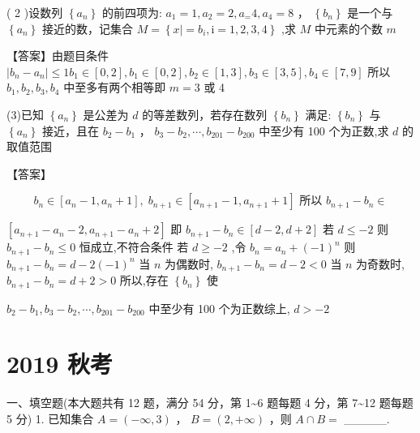 \documentclass[10pt]{article}
\newcommand*\circled[1]{\tikz[baseline=(char.base)]{\node[shape=circle,draw,inner sep=1.5pt] (char) {\small #1};}}
\begin{document}
( 2 )设数列 \(\left\{  {a}_{n}\right\}\) 的前四项为: \({a}_{1} = 1,{a}_{2} = 2,{a}_{ = }4,{a}_{4} = 8\) ， \(\left\{  {b}_{n}\right\}\) 是一个与 \(\left\{  {a}_{n}\right\}\) 接近的数，记集合 \(M = \left\{  {x \mid   = {b}_{i},\mathrm{i} = 1,2,3,4}\right\}\) ,求 \(M\) 中元素的个数 \(m\)

【答案】由题目条件 \(\left| {{b}_{n} - {a}_{n}}\right|  \leq  1{b}_{1} \in  \left\lbrack  {0,2}\right\rbrack  ,{b}_{1} \in  \left\lbrack  {0,2}\right\rbrack  ,{b}_{2} \in  \left\lbrack  {1,3}\right\rbrack  ,{b}_{3} \in  \left\lbrack  {3,5}\right\rbrack  ,{b}_{4} \in  \left\lbrack  {7,9}\right\rbrack\) 所以 \({b}_{1},{b}_{2},{b}_{3},{b}_{4}\) 中至多有两个相等即 \(m = 3\) 或 4

(3)已知 \(\left\{  {a}_{n}\right\}\) 是公差为 \(d\) 的等差数列，若存在数列 \(\left\{  {b}_{n}\right\}\) 满足: \(\left\{  {b}_{n}\right\}\) 与 \(\left\{  {a}_{n}\right\}\) 接近，且在 \({b}_{2} - {b}_{1}\) ， \({b}_{3} - {b}_{2},\cdots ,{b}_{201} - {b}_{200}\) 中至少有 100 个为正数,求 \(d\) 的取值范围

【答案】

\[
{b}_{n} \in  \left\lbrack  {{a}_{n} - 1,{a}_{n} + 1}\right\rbrack  ,\;{b}_{n + 1} \in  \left\lbrack  {{a}_{n + 1} - 1,{a}_{n + 1} + 1}\right\rbrack  \text{ 所以 }{b}_{n + 1} - {b}_{n} \in
\]

\(\left\lbrack  {{a}_{n + 1} - {a}_{n} - 2,{a}_{n + 1} - {a}_{n} + 2}\right\rbrack\) 即 \({b}_{n + 1} - {b}_{n} \in  \left\lbrack  {d - 2,d + 2}\right\rbrack\)  \circled{1} 若 \(d \leq   - 2\) 则 \({b}_{n + 1} - {b}_{n} \leq  0\) 恒成立,不符合条件 \circled{2} 若 \(d \geq   - 2\) ,令 \({b}_{n} = {a}_{n} + {\left( -1\right) }^{n}\) 则 \({b}_{n + 1} - {b}_{n} = d - 2{\left( -1\right) }^{n}\) 当 \(n\) 为偶数时, \({b}_{n + 1} - {b}_{n} = d - 2 < 0\) 当 \(n\) 为奇数时, \({b}_{n + 1} - {b}_{n} = d + 2 > 0\) 所以,存在 \(\left\{  {b}_{n}\right\}\) 使

\({b}_{2} - {b}_{1},{b}_{3} - {b}_{2},\cdots ,{b}_{201} - {b}_{200}\) 中至少有 100 个为正数综上, \(d >  - 2\)

\section*{2019 秋考}

一、填空题(本大题共有 12 题，满分 54 分，第 1\textasciitilde 6 题每题 4 分，第 7\textasciitilde 12 题每题 5 分) 1. 已知集合 \(A = \left( {-\infty ,3}\right)\) ， \(B = \left( {2, + \infty }\right)\) ，则 \(A \cap  B =\) \_\_\_\_\_.
\end{document}
